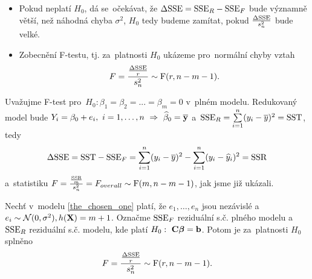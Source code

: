 \begin{itemize}
	\item Pokud neplatí $H_0$, dá se~očekávat, že $\Delta\mathrm{SSE} = \mathrm{SSE}_R-\mathrm{SSE}_F$ bude významně větší, než náhodná chyba $\sigma^2$, $H_0$ tedy budeme zamítat, pokud $\frac{\Delta\mathrm{SSE}}{s_n^2}$ bude velké.
	\item Zobecnění F-testu, tj. za~platnosti $H_0$ ukázeme pro~normální chyby vztah
	 $$ F = \frac{\frac{\Delta\mathrm{SSE}}{r}}{s_n^2}\sim\mathrm{F}(r,n-m-1). $$
\end{itemize}
\begin{example}
	Uvažujme F-test pro~$H_0:\beta_1 = \beta_2 = ... = \beta_m = 0$ v~plném modelu. Redukovaný model bude $Y_i = \beta_0+e_i,~i = 1,\dots,n~\Rightarrow~\widehat{\beta}_0 = \overline{\mathbf{y}}$ a~$\mathrm{SSE}_R = \sum\limits_{i=1}^{n} (y_i-\overline{y})^2 = \mathrm{SST}$, tedy
	 $$ \Delta \mathrm{SSE} = \mathrm{SST}-\mathrm{SSE}_F = \sum\limits_{i=1}^{n} (y_i-\overline{y})^2-\sum\limits_{i=1}^{n} (y_i-\widehat{y}_i)^2 = \mathrm{SSR} $$
	 a~statistiku $F = \frac{\frac{\mathrm{SSR}}{m}}{s_n^2} = F_{overall}\sim\mathrm{F}(m,n-m-1)$, jak jsme již ukázali.
\end{example}
\begin{theorem}
	Nechť v~modelu \eqref{the_chosen_one} platí, že $e_1,\dots,e_n$ jsou nezávislé a~$e_i\sim\mathcal{N}(0,\sigma^2), h(\mathbf{X}) = m + 1$. Označme $\mathrm{SSE}_F$ reziduální s.č. plného modelu a~$\mathrm{SSE}_R$ reziduální s.č. modelu, kde platí $H_0:~\textbf{C}\boldsymbol{\beta} = \textbf{b}$. Potom je za~platnosti $H_0$ splněno
	 $$ F = \frac{\frac{\Delta\mathrm{SSE}}{r}}{s_n^2}\sim\mathrm{F}(r,n-m-1). $$
\end{theorem}
